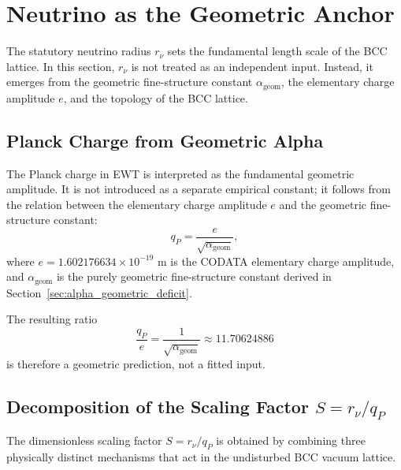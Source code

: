 \documentclass[10pt,a4paper]{article}
\begin{document}
\section{Neutrino as the Geometric Anchor}
\label{sec:neutrino_anchor}

The statutory neutrino radius \(r_\nu\) sets the fundamental length scale of the BCC lattice. In this section, \(r_\nu\) is not treated as an independent input. Instead, it emerges from the geometric fine-structure constant \(\alpha_{\text{geom}}\), the elementary charge amplitude \(e\), and the topology of the BCC lattice.

\subsection{Planck Charge from Geometric Alpha}
\label{sec:qP_from_alpha}

The Planck charge in EWT is interpreted as the fundamental geometric amplitude. It is not introduced as a separate empirical constant; it follows from the relation between the elementary charge amplitude \(e\) and the geometric fine-structure constant:
\begin{equation}
	q_P = \frac{e}{\sqrt{\alpha_{\text{geom}}}},
	\label{eq:qP_from_alpha}
\end{equation}
where \(e = 1.602176634 \times 10^{-19}\) m is the CODATA elementary charge amplitude, and \(\alpha_{\text{geom}}\) is the purely geometric fine-structure constant derived in Section~\ref{sec:alpha_geometric_deficit}.

The resulting ratio
\begin{equation}
	\frac{q_P}{e} = \frac{1}{\sqrt{\alpha_{\text{geom}}}} \approx 11.70624886
\end{equation}
is therefore a geometric prediction, not a fitted input.

\subsection{Decomposition of the Scaling Factor \(S = r_\nu/q_P\)}
\label{sec:S_decomposition}

The dimensionless scaling factor \(S = r_\nu/q_P\) is obtained by combining three physically distinct mechanisms that act in the undisturbed BCC vacuum lattice.
\end{document}
